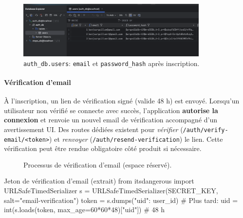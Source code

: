 \begin{itemize}
\begin{figure}[H]
  \centering
  \includegraphics[width=0.85\textwidth]{../figures/chap10/auth_db1.png}
  \caption{\texttt{auth\_db.users}: \texttt{email} et \texttt{password\_hash} après inscription.}
\end{figure}

\paragraph{Vérification d'email}
À l'inscription, un lien de vérification signé (valide 48 h) est envoyé. Lorsqu'un utilisateur non vérifié se connecte avec succès, l'application \textbf{autorise la connexion} et renvoie un nouvel email de vérification accompagné d'un avertissement UI. Des routes dédiées existent pour \textit{vérifier} (\texttt{/auth/verify-email/<token>}) et \textit{renvoyer} (\texttt{/auth/resend-verification}) le lien. Cette vérification peut être rendue obligatoire côté produit si nécessaire.

\begin{figure}[H]
  \centering
  \caption{Processus de vérification d'email (espace réservé).}
\end{figure}

\begin{codebox}[language=Python]{Jeton de vérification d'email (extrait)}
from itsdangerous import URLSafeTimedSerializer
s = URLSafeTimedSerializer(SECRET_KEY, salt="email-verification")
token = s.dumps({"uid": user_id})
# Plus tard:  uid = int(s.loads(token, max_age=60*60*48)["uid"])  # 48 h
\end{codebox}


\end{itemize}
